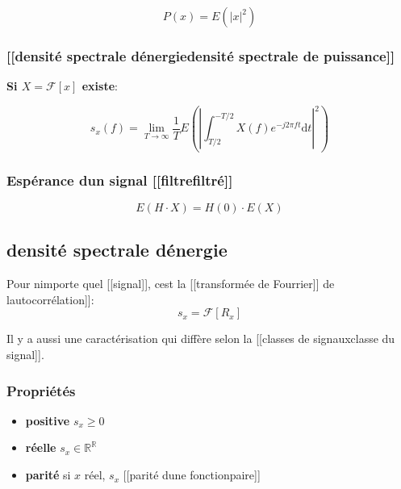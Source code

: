 \documentclass[
]{article}
\providecommand{\tightlist}{%
  \setlength{\itemsep}{0pt}\setlength{\parskip}{0pt}}
\begin{document}
\[
P(x) = E(|x|^2)
\]

\hypertarget{densituxe9-spectrale-duxe9nergiedensituxe9-spectrale-de-puissance-2}{%
\subsubsection{{[}{[}densité spectrale
d\textquotesingle énergie\textbar densité spectrale de
puissance{]}{]}}\label{densituxe9-spectrale-duxe9nergiedensituxe9-spectrale-de-puissance-2}}

\textbf{Si \(X = \mathcal{F}[x]\) existe}:

\[
s_x(f) = \lim_{T\to \infty} \frac{1}{T} E\left( \left| \int^{-T/2}_{T/2} X(f) e^{-j2\pi ft} \mathrm{d}t \right|^2 \right)
\]

\hypertarget{espuxe9rance-dun-signal-filtrefiltruxe9}{%
\subsubsection{Espérance d\textquotesingle un signal
{[}{[}filtre\textbar filtré{]}{]}}\label{espuxe9rance-dun-signal-filtrefiltruxe9}}

\[
E(H \cdot X) = H(0) \cdot E(X)
\]

\hypertarget{densituxe9-spectrale-duxe9nergie-1}{%
\subsection{densité spectrale
d\textquotesingle énergie}\label{densituxe9-spectrale-duxe9nergie-1}}

Pour n\textquotesingle importe quel {[}{[}signal{]}{]},
c\textquotesingle est la {[}{[}transformée de Fourrier{]}{]} de
l\textquotesingle{[}{[}autocorrélation{]}{]}: \[
s_x = \mathcal{F}[R_x]
\]

Il y a aussi une caractérisation qui diffère selon la {[}{[}classes de
signaux\textbar classe du signal{]}{]}.

\hypertarget{propriuxe9tuxe9s-4}{%
\subsubsection{Propriétés}\label{propriuxe9tuxe9s-4}}

\begin{itemize}
\tightlist
\item
  \textbf{positive} \(s_x \geq 0\)
\item
  \textbf{réelle} \(s_x \in \mathbb{R}^\mathbb{R}\)
\item
  \textbf{parité} si \(x\) réel, \(s_x\) {[}{[}parité
  d\textquotesingle une fonction\textbar paire{]}{]}
\end{itemize}
\end{document}
